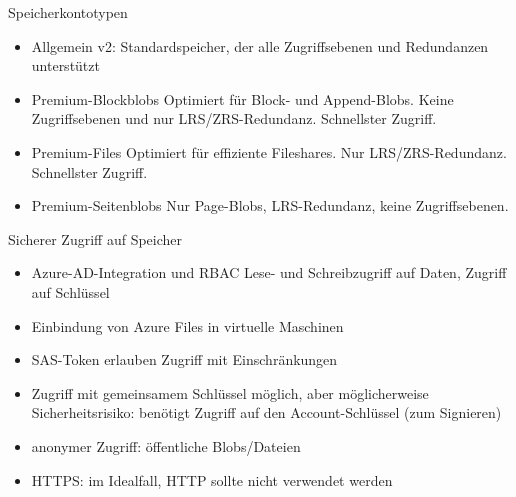 \begin{flashcard}[Definition]{Speicherkontotypen}
  \begin{itemize}
    \item Allgemein v2:\newline
      Standardspeicher, der alle Zugriffsebenen und Redundanzen unterstützt
    \item Premium-Blockblobs\newline
      Optimiert für Block- und Append-Blobs. Keine Zugriffsebenen und nur LRS/ZRS-Redundanz. Schnellster Zugriff.
    \item Premium-Files\newline
      Optimiert für effiziente Fileshares. Nur LRS/ZRS-Redundanz. Schnellster Zugriff.
    \item Premium-Seitenblobs\newline
      Nur Page-Blobs, LRS-Redundanz, keine Zugriffsebenen.
  \end{itemize}
\end{flashcard}

\begin{flashcard}[Definition]{Sicherer Zugriff auf Speicher}
  \begin{itemize}
    \item Azure-AD-Integration und RBAC\newline
      Lese- und Schreibzugriff auf Daten, Zugriff auf Schlüssel
    \item Einbindung von Azure Files in virtuelle Maschinen
    \item SAS-Token erlauben Zugriff mit Einschränkungen
    \item Zugriff mit gemeinsamem Schlüssel möglich, aber möglicherweise Sicherheitsrisiko:\newline
      benötigt Zugriff auf den Account-Schlüssel (zum Signieren)
    \item anonymer Zugriff: öffentliche Blobs/Dateien
    \item HTTPS: im Idealfall, HTTP sollte nicht verwendet werden
  \end{itemize}
\end{flashcard}

